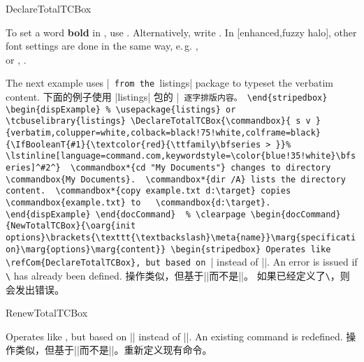 \begin{docCommand}{DeclareTotalTCBox}{}
\begin{dispExample}
To set a word \textbf{bold} in \myverb{\LaTeX}, use
. Alternatively, write
.
In \myverb[blue]{\LaTeX}[enhanced,fuzzy halo], other font settings are
done in the same way, e.\,g. \myverb{\textit}, \myverb{\itshape}\\
or \myverb[brown]{\texttt}, \myverb[brown]{\ttfamily}.
\end{dispExample}

\begin{stripedbox}
The next example uses |\lstinline| from the |listings| package to
typeset the verbatim content.
\tcblower
下面的例子使用 |listings| 包的 |\lstinline| 逐字排版内容。
\end{stripedbox}


\begin{dispExample}
% \usepackage{listings} or \tcbuselibrary{listings}
\DeclareTotalTCBox{\commandbox}{ s v }
{verbatim,colupper=white,colback=black!75!white,colframe=black}
{\IfBooleanT{#1}{\textcolor{red}{\ttfamily\bfseries > }}%
  \lstinline[language=command.com,keywordstyle=\color{blue!35!white}\bfseries]^#2^}

\commandbox*{cd "My Documents"} changes to directory \commandbox{My Documents}.

\commandbox*{dir /A} lists the directory content.

\commandbox*{copy example.txt d:\target} copies \commandbox{example.txt} to
  \commandbox{d:\target}.
\end{dispExample}
\end{docCommand}

% \clearpage
\begin{docCommand}{NewTotalTCBox}{\oarg{init options}\brackets{\texttt{\textbackslash}\meta{name}}\marg{specification}\marg{options}\marg{content}}
\begin{stripedbox}
Operates like \refCom{DeclareTotalTCBox}, but based on |\NewDocumentCommand| instead of |\DeclareDocumentCommand|.
An error is issued if \texttt{\textbackslash} has already been defined.
\tcblower
操作类似，但基于|\NewDocumentCommand|而不是|\DeclareDocumentCommand|。%
如果已经定义了\texttt{\textbackslash}，则会发出错误。
\end{stripedbox}
\end{docCommand}

\begin{docCommand}{RenewTotalTCBox}{}
\begin{stripedbox}
Operates like , but based on |\RenewDocumentCommand| instead of |\DeclareDocumentCommand|.
An existing command is redefined.
\tcblower
操作类似，但基于|\RenewDocumentCommand|而不是|\DeclareDocumentCommand|。重新定义现有命令。
\end{stripedbox}
\end{docCommand}

